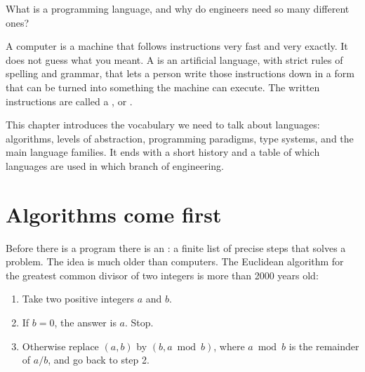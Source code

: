{}
\label{ch:intro}

\begin{researchquestion}
What is a programming language, and why do engineers need so many different ones?
\end{researchquestion}

A computer is a machine that follows instructions very fast and very exactly. It does
not guess what you meant. A  is an artificial language,
with strict rules of spelling and grammar, that lets a person write those instructions
down in a form that can be turned into something the machine can execute. The written
instructions are called a , or .

This chapter introduces the vocabulary we need to talk about languages: algorithms,
levels of abstraction, programming paradigms, type systems, and the main language
families. It ends with a short history and a table of which languages are used in which
branch of engineering.


\section{Algorithms come first}

Before there is a program there is an : a finite list of precise steps
that solves a problem. The idea is much older than computers. The Euclidean algorithm for
the greatest common divisor of two integers is more than 2000 years old:

\begin{enumerate}
\item Take two positive integers $a$ and $b$.
\item If $b = 0$, the answer is $a$. Stop.
\item Otherwise replace $(a, b)$ by $(b, a \bmod b)$, where $a\bmod b$ is the remainder
  of $a/b$, and go back to step 2.
\end{enumerate}

